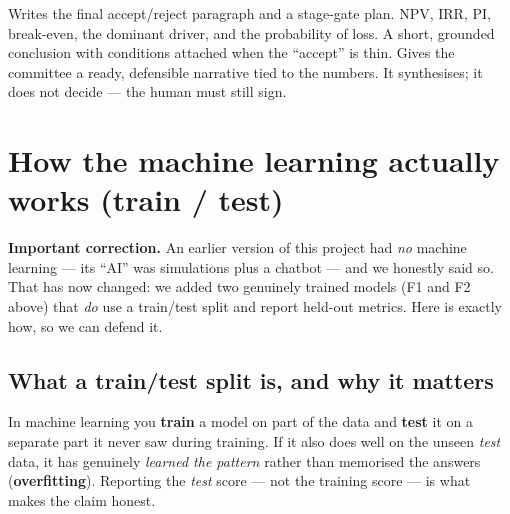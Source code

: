 \documentclass[11pt,a4paper]{article}
\newcommand{\term}[1]{\textcolor{tvblue}{\textbf{#1}}}
\begin{document}
{Writes the final accept/reject paragraph and a stage-gate plan.}
{NPV, IRR, PI, break-even, the dominant driver, and the probability of loss.}
{A short, grounded conclusion with conditions attached when the ``accept'' is thin.}
{Gives the committee a ready, defensible narrative tied to the numbers.}
{It synthesises; it does not decide --- the human must still sign.}

\section{How the machine learning actually works (train / test)}
\label{sec:ml}
\textbf{Important correction.} An earlier version of this project had \emph{no} machine learning ---
its ``AI'' was simulations plus a chatbot --- and we honestly said so. That has now changed: we added
two genuinely trained models (F1 and F2 above) that \emph{do} use a train/test split and report
held-out metrics. Here is exactly how, so we can defend it.

\subsection{What a train/test split is, and why it matters}
In machine learning you \term{train} a model on part of the data and \term{test} it on a separate part
it never saw during training. If it also does well on the unseen \emph{test} data, it has genuinely
\emph{learned the pattern} rather than memorised the answers (\term{overfitting}). Reporting the
\emph{test} score --- not the training score --- is what makes the claim honest.
\end{document}

